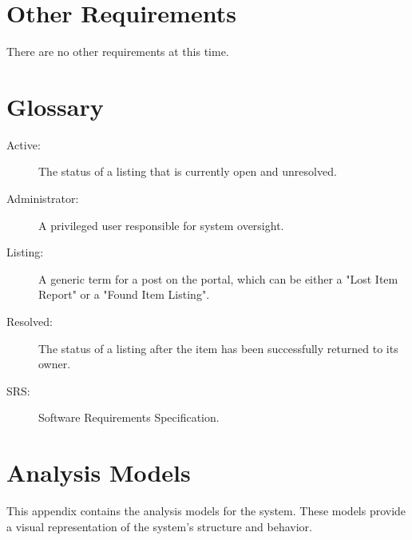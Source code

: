 \documentclass[11pt, a4paper]{article}
\begin{document}
\section{Other Requirements}
There are no other requirements at this time.
\newpage

\appendix

\section{Glossary}
\begin{description}
    \item[Active:] The status of a listing that is currently open and unresolved.
    \item[Administrator:] A privileged user responsible for system oversight.
    \item[Listing:] A generic term for a post on the portal, which can be either a "Lost Item Report" or a "Found Item Listing".
    \item[Resolved:] The status of a listing after the item has been successfully returned to its owner.
    \item[SRS:] Software Requirements Specification.
\end{description}

\section{Analysis Models}
This appendix contains the analysis models for the system. These models provide a visual representation of the system's structure and behavior.
\end{document}
